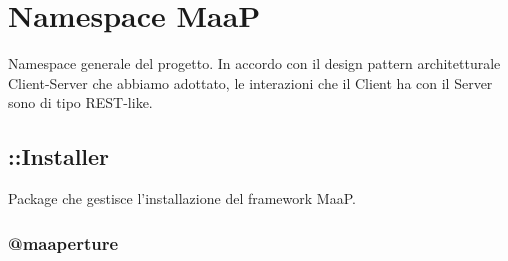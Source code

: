 \newpage


\section{Namespace MaaP}
Namespace generale del progetto. In accordo con il design pattern architetturale Client-Server che 
abbiamo adottato, le interazioni che il Client ha con il Server sono di tipo REST-like.

\subsection{::Installer}
Package che gestisce l'installazione del framework MaaP. 


\subsubsection{@maaperture}

